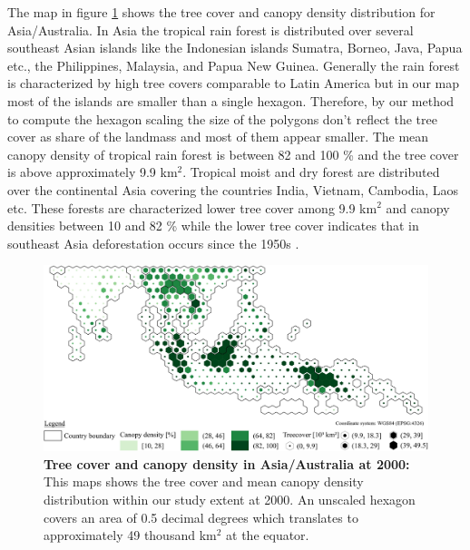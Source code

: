 			The map in figure \ref{fig:asia_tree_cover} shows the tree cover and canopy density distribution for Asia/Australia. In Asia the tropical rain forest is distributed over several southeast Asian islands like the Indonesian islands Sumatra, Borneo, Java, Papua etc., the Philippines, Malaysia, and Papua New Guinea. Generally the rain forest is characterized by high tree covers comparable to Latin America but in our map most of the islands are smaller than a single hexagon. Therefore, by our method to compute the hexagon scaling the size of the polygons don't reflect the tree cover as share of the landmass and most of them appear smaller. The mean canopy density of tropical rain forest is between 82 and 100 \% and the tree cover is above approximately 9.9 km$^2$. Tropical moist and dry forest are distributed over the continental Asia covering the countries India, Vietnam, Cambodia, Laos etc. These forests are characterized lower tree cover among 9.9 km$^2$ and canopy densities between 10 and 82 \% while the lower tree cover indicates that in southeast Asia deforestation occurs since the 1950s \citep{Kummer1994}. 
			\begin{figure}[ht]
				\centering
				\includegraphics[scale=1.]{img/asia_treecover_frameless}
				\caption[Tree cover and canopy density in Asia/Australia at 2000]{\textbf{Tree cover and canopy density in Asia/Australia at 2000:} This maps shows the tree cover and mean canopy density distribution within our study extent at 2000. An unscaled hexagon covers an area of 0.5 decimal degrees which translates to approximately 49 thousand km$^2$ at the equator.}
				\label{fig:asia_tree_cover}
			\end{figure}

